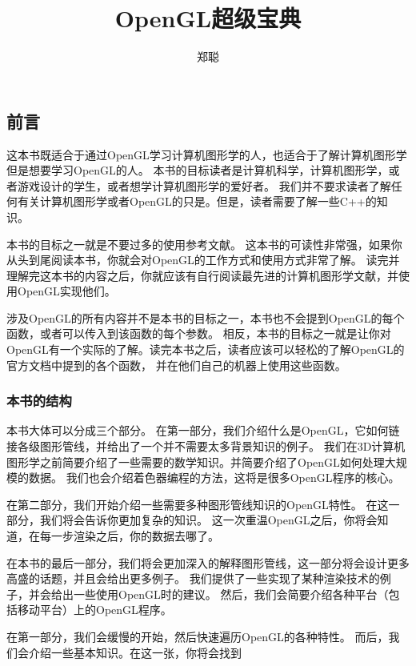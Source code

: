 \documentclass{book}
\begin{document}
\begin{CJK}{UTF8}{gbsn}

\author{郑聪}
\title{OpenGL超级宝典}
\maketitle

\chapter{前言}

这本书既适合于通过OpenGL学习计算机图形学的人，也适合于了解计算机图形学但是想要学习OpenGL的人。
本书的目标读者是计算机科学，计算机图形学，或者游戏设计的学生，或者想学计算机图形学的爱好者。
我们并不要求读者了解任何有关计算机图形学或者OpenGL的只是。但是，读者需要了解一些C++的知识。

本书的目标之一就是不要过多的使用参考文献。
这本书的可读性非常强，如果你从头到尾阅读本书，你就会对OpenGL的工作方式和使用方式非常了解。
读完并理解完这本书的内容之后，你就应该有自行阅读最先进的计算机图形学文献，并使用OpenGL实现他们。

涉及OpenGL的所有内容并不是本书的目标之一，本书也不会提到OpenGL的每个函数，或者可以传入到该函数的每个参数。
相反，本书的目标之一就是让你对OpenGL有一个实际的了解。读完本书之后，读者应该可以轻松的了解OpenGL的官方文档中提到的各个函数，
并在他们自己的机器上使用这些函数。

\subsection{本书的结构}
本书大体可以分成三个部分。
在第一部分，我们介绍什么是OpenGL，它如何链接各级图形管线，并给出了一个并不需要太多背景知识的例子。
我们在3D计算机图形学之前简要介绍了一些需要的数学知识。并简要介绍了OpenGL如何处理大规模的数据。
我们也会介绍着色器编程的方法，这将是很多OpenGL程序的核心。

在第二部分，我们开始介绍一些需要多种图形管线知识的OpenGL特性。
在这一部分，我们将会告诉你更加复杂的知识。
这一次重温OpenGL之后，你将会知道，在每一步渲染之后，你的数据去哪了。

在本书的最后一部分，我们将会更加深入的解释图形管线，这一部分将会设计更多高盛的话题，并且会给出更多例子。
我们提供了一些实现了某种渲染技术的例子，并会给出一些使用OpenGL时的建议。
然后，我们会简要介绍各种平台（包括移动平台）上的OpenGL程序。

在第一部分，我们会缓慢的开始，然后快速遍历OpenGL的各种特性。
而后，我们会介绍一些基本知识。在这一张，你将会找到


\end{CJK}
\end{document}
